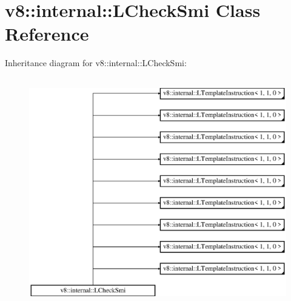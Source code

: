 \hypertarget{classv8_1_1internal_1_1_l_check_smi}{}\section{v8\+:\+:internal\+:\+:L\+Check\+Smi Class Reference}
\label{classv8_1_1internal_1_1_l_check_smi}
Inheritance diagram for v8\+:\+:internal\+:\+:L\+Check\+Smi\+:\begin{figure}[H]
\begin{center}
\leavevmode
\includegraphics[height=10.000000cm]{classv8_1_1internal_1_1_l_check_smi}
\end{center}
\end{figure}

